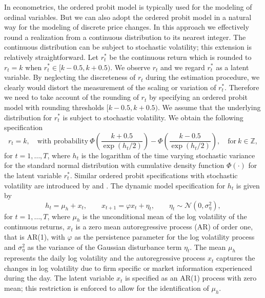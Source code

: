 \documentclass[12pt]{article}
\begin{document}
In econometrics, the ordered probit model is typically used for
the modeling of ordinal variables.
But we can also adopt the ordered probit model in a natural way for the
modeling of discrete price changes. In this approach we effectively
round a realization from a continuous distribution to its nearest integer.
The continuous distribution can be subject to
stochastic volatility; this extension is relatively straightforward.
Let $r^{*}_{t}$ be the continuous return which
is rounded to $r_{t}=k$ when $r^{*}_{t} \in [k-0.5,k+0.5)$.
We observe $r_t$ and we regard $r^{*}_{t}$ as a latent variable.
By neglecting the discreteness of $r_{t}$ during the estimation
procedure, we clearly would distort the measurement of the scaling
or variation of $r_t^*$.
Therefore we need to take account of the rounding of $r_{t}$ by specifying
an ordered probit model with rounding thresholds $[k-0.5,k+0.5)$.
We assume that the underlying distribution for $r^{*}_{t}$ is subject to
stochastic volatility.
We obtain the following specification
\begin{equation}
r_{t} =k, \quad \text{with probability} \ \Phi\left(\frac{k+0.5}{  \exp(h_t/2)}\right)- \Phi\left(\frac{k-0.5}{ \exp(h_t/2)}\right),  \quad \text{for} \ k \in \mathbb{Z},
\label{eq:probitn}
\end{equation}
for $t=1,\ldots,T$,
where $h_{t}$ is the logarithm of the time varying stochastic variance
for the standard normal distribution with cumulative density function
$\Phi(\cdot)$ for the latent variable $r^{*}_{t}$.
Similar ordered probit specifications with
stochastic volatility are introduced by \citet{MullerCzado2006} and
\citet{Stefanos2015}. The dynamic model specification for $h_{t}$ is given by
\begin{equation}
h_{t} = \mu_{h} +x_{t}, \qquad
x_{t+1} = \varphi x_{t} + \eta_{t}, \qquad
\eta_{t} \sim \mathcal{N}\left(0, \sigma^{2}_{\eta}\right),
\label{eq:logsv}
\end{equation}
for $t=1,\ldots,T$,
where $\mu_{h}$ is the unconditional mean of the log volatility of
the continuous returns,
$x_{t}$ is a zero mean autoregressive process (AR) of order one, that is AR(1),
with $\varphi$ as the persistence parameter
for the log volatility process and
$\sigma^{2}_{\eta}$ as the variance of the Gaussian disturbance term
$\eta _{t}$.
The mean $\mu _h$ represents the daily log volatility and
the autoregressive process $x_t$ captures the changes in log volatility due to
firm specific or market information experienced during the day.
The latent variable $x_t$ is specified as an AR(1) process with zero mean;
this restriction is enforced to allow for the identification of $\mu _h$.
\end{document}
